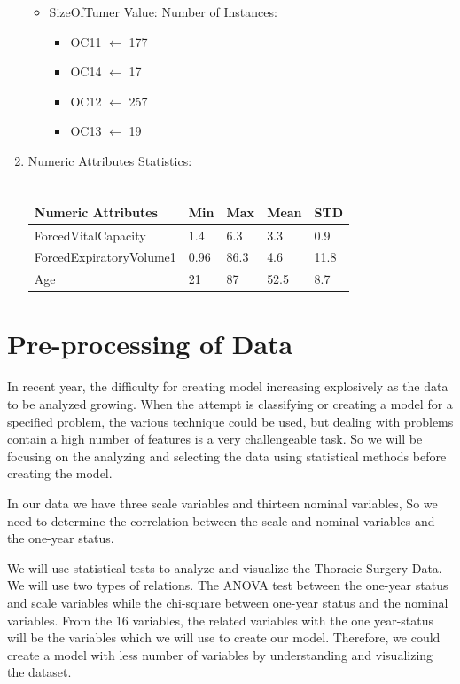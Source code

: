 \documentclass[a4paper, 11pt, oneside]{article} %
\begin{document}
\begin{enumerate}
\begin{itemize}
\item{SizeOfTumer Value: Number of Instances:}
\begin{itemize}
\item OC11 $\leftarrow$ 177
\item OC14 $\leftarrow$ 17
\item OC12 $\leftarrow$ 257
\item OC13 $\leftarrow$ 19
\end{itemize}
\end{itemize}
\item {Numeric Attributes Statistics:}\\\\
\begin{tabular}{ |p{4.5cm}||p{2cm}|p{2cm}|p{2cm}| p{2cm}| }
 \hline
 Numeric Attributes&Min& Max&Mean&STD\\
 \hline
ForcedVitalCapacity   & 1.4    &6.3&  3.3 &0.9 \\
ForcedExpiratoryVolume1 &  0.96  & 86.3   &4.6 &11.8\\
 Age &21 & 87&  52.5 & 8.7\\
 \hline
\end{tabular}

\end{enumerate}

\section {Pre-processing of Data}
In recent year, the difficulty for creating model increasing explosively as the data to be analyzed growing. When the attempt is classifying or creating a model for a specified problem, the various technique could be used, but dealing with problems contain a high number of features is a very challengeable task. So we will be focusing on the analyzing and selecting the data using statistical methods before creating the model.

In our data we have three scale variables and thirteen nominal variables, So we need to determine the correlation between the scale and nominal variables and the one-year status.\cite{researchgate} 

We will use statistical tests to analyze and visualize the Thoracic Surgery Data. We will use two types of relations. The ANOVA test \cite{analyticsvidhya1} between the one-year status and scale variables while the chi-square\cite{mathsisfun}  between one-year status and the nominal variables. From the 16 variables, the related variables with the one year-status will be the variables which we will use to create our model. Therefore, we could create a model with less number of variables by understanding and visualizing the dataset. 
\end{document}
